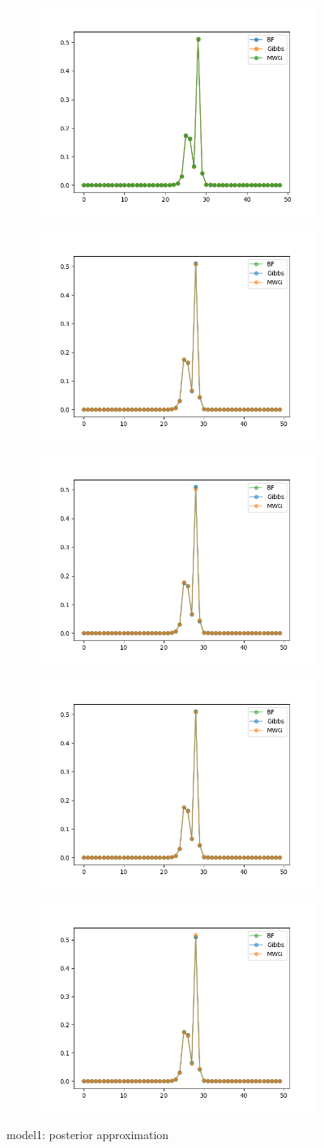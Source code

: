 \begin{figure}[h]
    \centering
    \begin{subfigure}
    	\centering
        \includegraphics[width=0.3\linewidth]{../../plots/Posterior_M2_N50_NMCMC1_seed0_diffind2.png}
    \end{subfigure}
    \begin{subfigure}
        \centering
    	\includegraphics[width=0.3\linewidth]{../../plots/Posterior_M2_N50_NMCMC1_seed1_diffind2.png}
	\end{subfigure}
	\begin{subfigure}
	    \centering
    	\includegraphics[width=0.3\linewidth]{../../plots/Posterior_M2_N50_NMCMC1_seed2_diffind2.png}
	\end{subfigure}
	\begin{subfigure}
	    \centering
    	\includegraphics[width=0.3\linewidth]{../../plots/Posterior_M2_N50_NMCMC1_seed3_diffind2.png}
	\end{subfigure}
	\begin{subfigure}
	    \centering
    	\includegraphics[width=0.3\linewidth]{../../plots/Posterior_M2_N50_NMCMC1_seed4_diffind2.png}
	\end{subfigure}
	\caption{model1: posterior approximation}
\end{figure}

